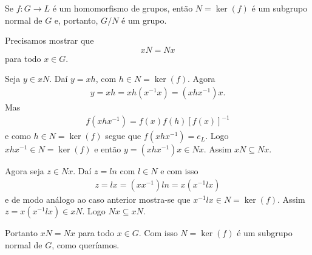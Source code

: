 \begin{lema}
    Se $f : G \to L$ é um homomorfismo de grupos, então $N = \ker(f)$ é um subgrupo normal de $G$ e, portanto, $G/N$ é um grupo.
\end{lema}
\begin{prova}
    Precisamos mostrar que
    \[
        xN = Nx
    \]
    para todo $x \in G$.

    Seja $y \in xN$. Daí $y = xh$, com $h \in N = \ker(f)$. Agora
    \begin{align*}
        y = xh = xh(x^{-1}x) = (xhx^{-1})x.
    \end{align*}
    Mas
    \begin{align*}
        f(xhx^{-1}) = f(x)f(h)[f(x)]^{-1}
    \end{align*}
    e como $h \in N = \ker(f)$ segue que $f(xhx^{-1}) = e_L$. Logo $xhx^{-1} \in N = \ker(f)$ e então $y = (xhx^{-1})x \in Nx$. Assim $xN \subseteq Nx$.

    Agora seja $z \in Nx$. Daí $z = ln$ com $l \in N$ e com isso
    \begin{align*}
        z = lx = (xx^{-1})ln = x(x^{-1}lx)
    \end{align*}
    e de modo análogo ao caso anterior mostra-se que $x^{-1}lx \in N = \ker(f)$. Assim $z = x(x^{-1}lx) \in xN$. Logo $Nx \subseteq xN$.

    Portanto $xN = Nx$ para todo $x \in G$. Com isso $N = \ker(f)$ é um subgrupo normal de $G$, como queríamos.
\end{prova}

